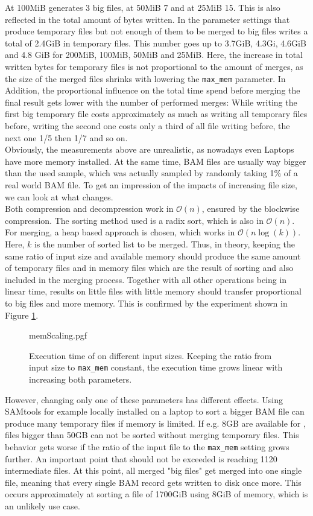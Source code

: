 At 100MiB \sort generates 3 big files, at 50MiB 7 and at 25MiB 15. This is also reflected in the total amount of bytes written. In the parameter settings that produce temporary files but not enough of them to be merged to big files \sort writes a total of 2.4GiB in temporary files. This number goes up to 3.7GiB, 4.3Gi, 4.6GiB and 4.8 GiB for 200MiB, 100MiB, 50MiB and 25MiB. Here, the increase in total written bytes for temporary files is not proportional to the amount of merges, as the size of the merged files shrinks with lowering the \texttt{max\_mem} parameter. In Addition, the proportional influence on the total time spend before merging the final result gets lower with the number of performed merges: While writing the first big temporary file costs approximately as much as writing all temporary files before, writing the second one costs only a third of all file writing before, the next one 1/5 then 1/7 and so on.\\
Obviously, the measurements above are unrealistic, as nowadays even Laptops have more memory installed. At the same time, BAM files are usually way bigger than the used sample, which was actually sampled by randomly taking 1\% of a real world BAM file. To get an impression of the impacts of increasing file size, we can look at what changes. \\
Both compression and decompression work in $\mathcal{O}(n)$, ensured by the blockwise compression. The sorting method used is a radix sort, which is also in $\mathcal{O}(n)$. For merging, a heap based approach is chosen, which works in $\mathcal{O}(n \log(k))$. Here, $k$ is the number of sorted list to be merged. Thus, in theory, keeping the same ratio of input size and available memory should produce the same amount of temporary files and in memory files which are the result of sorting and also included in the merging process. Together with all other operations being in linear time, results on little files with little memory should transfer proportional to big files and more memory. This is confirmed by the experiment shown in Figure \ref{fig:memScaling}.\\
\begin{figure}
        {memScaling.pgf}
    \caption{Execution time of \sort on different input sizes. Keeping the ratio from input size to \texttt{max\_mem} constant, the execution time grows linear with increasing both parameters.}
    \label{fig:memScaling}
\end{figure}
However, changing only one of these parameters has different effects. Using SAMtools for example locally installed on a laptop to sort a bigger BAM file can produce many temporary files if memory is limited. If e.g. 8GB are available for \sort, files bigger than 50GB can not be sorted without merging temporary files. This behavior gets worse if the ratio of the input file to the \texttt{max\_mem} setting grows further. An important point that should not be exceeded is reaching 1120 intermediate files. At this point, all merged "big files" get merged into one single file, meaning that every single BAM record gets written to disk once more. This occurs approximately at sorting a file of 1700GiB using 8GiB of memory, which is an unlikely use case. \\
